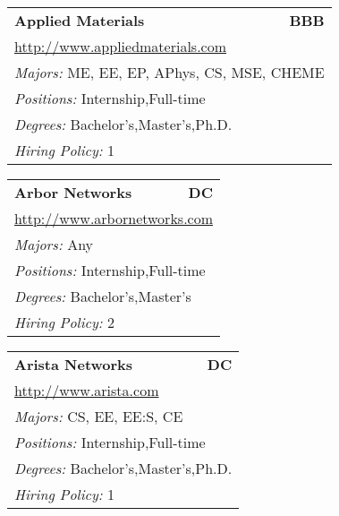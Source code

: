 \documentclass[twoside]{article}
\begin{document}
\begin{center}
\begin{multicols}{3}
\begin{FlushLeft}
\begin{minipage}{.9\columnwidth}
\end{minipage}
 
\begin{minipage}{.9\columnwidth}\begin{tabularx}{.95\columnwidth}{Xr}
                 {\Large\bf Applied Materials} & {\Large\bf BBB}\\
    \multicolumn{2}{p{.95\columnwidth}}{\url{http://www.appliedmaterials.com}}\\
    \multicolumn{2}{p{.95\columnwidth}}{\emph{Majors:} ME, EE, EP, APhys, CS, MSE, CHEME}\\
    \multicolumn{2}{p{.95\columnwidth}}{\emph{Positions:} Internship,Full-time}\\
    \multicolumn{2}{p{.95\columnwidth}}{\emph{Degrees:} Bachelor's,Master's,Ph.D.}\\
    \multicolumn{2}{p{.95\columnwidth}}{\emph{Hiring Policy:} 1}\\
    \end{tabularx}
    
\end{minipage}
 
\begin{minipage}{.9\columnwidth}\begin{tabularx}{.95\columnwidth}{Xr}
                 {\Large\bf Arbor Networks} & {\Large\bf DC}\\
    \multicolumn{2}{p{.95\columnwidth}}{\url{http://www.arbornetworks.com}}\\
    \multicolumn{2}{p{.95\columnwidth}}{\emph{Majors:} Any}\\
    \multicolumn{2}{p{.95\columnwidth}}{\emph{Positions:} Internship,Full-time}\\
    \multicolumn{2}{p{.95\columnwidth}}{\emph{Degrees:} Bachelor's,Master's}\\
    \multicolumn{2}{p{.95\columnwidth}}{\emph{Hiring Policy:} 2}\\
    \end{tabularx}
    
\end{minipage}
 
\begin{minipage}{.9\columnwidth}\begin{tabularx}{.95\columnwidth}{Xr}
                 {\Large\bf Arista Networks} & {\Large\bf DC}\\
    \multicolumn{2}{p{.95\columnwidth}}{\url{http://www.arista.com}}\\
    \multicolumn{2}{p{.95\columnwidth}}{\emph{Majors:} CS, EE, EE:S, CE}\\
    \multicolumn{2}{p{.95\columnwidth}}{\emph{Positions:} Internship,Full-time}\\
    \multicolumn{2}{p{.95\columnwidth}}{\emph{Degrees:} Bachelor's,Master's,Ph.D.}\\
    \multicolumn{2}{p{.95\columnwidth}}{\emph{Hiring Policy:} 1}\\
    \end{tabularx}
    

\end{minipage}
\end{FlushLeft}
\end{multicols}
\end{center}
\end{document}
